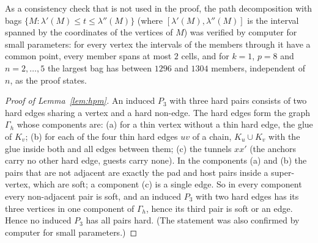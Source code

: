 \begin{remark}
As a consistency check that is not used in the proof, the path decomposition with bags $\{M:\lambda'(M)\le t\le\lambda''(M)\}$ (where $[\lambda'(M),\lambda''(M)]$ is the interval spanned by the coordinates of the vertices of $M$) was verified by computer for small parameters: for every vertex the intervals of the members through it have a common point, every member spans at most $2$ cells, and for $k=1$, $p=8$ and $n=2,\dots,5$ the largest bag has between $1296$ and $1304$ members, independent of $n$, as the proof states.
\end{remark}
\begin{proof}[Proof of Lemma~\ref{lem:hpm}]
An induced $P_3$ with three hard pairs consists of two hard edges sharing a vertex and a hard non-edge. The hard edges form the graph $\Gamma_h$ whose components are: (a) for a thin vertex without a thin hard edge, the glue of $K_v$; (b) for each of the four thin hard edges $uv$ of a chain, $K_u\cup K_v$ with the glue inside both and all edges between them; (c) the tunnels $xx'$ (the anchors carry no other hard edge, guests carry none). In the components (a) and (b) the pairs that are not adjacent are exactly the pad and host pairs inside a super-vertex, which are soft; a component (c) is a single edge. So in every component every non-adjacent pair is soft, and an induced $P_3$ with two hard edges has its three vertices in one component of $\Gamma_h$, hence its third pair is soft or an edge. Hence no induced $P_3$ has all pairs hard. (The statement was also confirmed by computer for small parameters.)
\end{proof}
